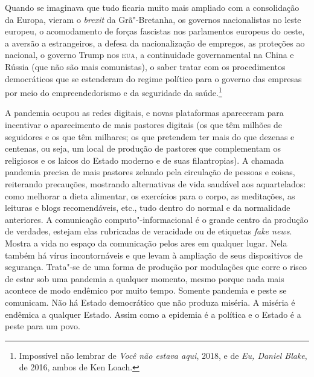 Quando se imaginava que tudo ficaria muito mais ampliado com a
consolidação da Europa, vieram o \emph{brexit} da Grã"-Bretanha, os
governos nacionalistas no leste europeu, o acomodamento de forças
fascistas nos parlamentos europeus do oeste, a aversão a estrangeiros, a
defesa da nacionalização de empregos, as proteções ao nacional, o
governo Trump nos \textsc{eua}, a continuidade governamental na China e Rússia
(que não são mais comunistas), o saber tratar com os procedimentos
democráticos que se estenderam do regime político para o governo das
empresas por meio do empreendedorismo e da seguridade da
saúde.\footnote{Impossível não lembrar de \emph{Você não estava aqui},
  2018, e de \emph{Eu, Daniel Blake}, de 2016, ambos de Ken Loach.}

A pandemia ocupou as redes digitais, e novas plataformas apareceram para
incentivar o aparecimento de mais pastores digitais (os que têm milhões
de seguidores e os que têm milhares; os que pretendem ter mais do que
dezenas e centenas, ou seja, um local de produção de pastores que
complementam os religiosos e os laicos do Estado moderno e de suas
filantropias). A chamada pandemia precisa de mais pastores zelando pela
circulação de pessoas e coisas, reiterando precauções, mostrando
alternativas de vida saudável aos aquartelados: como melhorar a dieta
alimentar, os exercícios para o corpo, as meditações, as leituras e
blogs recomendáveis, etc., tudo dentro do normal e da normalidade
anteriores. A comunicação computo"-informacional é o grande centro da
produção de verdades, estejam elas rubricadas de veracidade ou de
etiquetas \emph{fake news}. Mostra a vida no espaço da comunicação pelos
ares em qualquer lugar. Nela também há vírus incontornáveis e que levam
à ampliação de seus dispositivos de segurança. Trata"-se de uma forma de
produção por modulações que corre o risco de estar sob uma pandemia a
qualquer momento, mesmo porque nada mais acontece de modo endêmico por
muito tempo. Somente pandemia e peste se comunicam. Não há Estado
democrático que não produza miséria. A miséria é endêmica a qualquer
Estado. Assim como a epidemia é a política e o Estado é a peste para um
povo.

